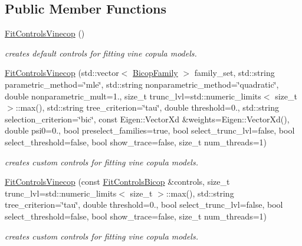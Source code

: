 \subsection*{Public Member Functions}
\begin{DoxyCompactItemize}
\item 
\mbox{\label{classvinecopulib_1_1_fit_controls_vinecop_ad101d135c8d8fe66046d931947f45bef}} 
\hyperlink{classvinecopulib_1_1_fit_controls_vinecop_ad101d135c8d8fe66046d931947f45bef}{Fit\+Controls\+Vinecop} ()
\begin{DoxyCompactList}\small\item\em creates default controls for fitting vine copula models. \end{DoxyCompactList}\item 
\hyperlink{classvinecopulib_1_1_fit_controls_vinecop_a94112587de376b493be4445aab15b7ce}{Fit\+Controls\+Vinecop} (std\+::vector$<$ \hyperlink{namespacevinecopulib_a42e95cc06d33896199caab0c11ad44f3}{Bicop\+Family} $>$ family\+\_\+set, std\+::string parametric\+\_\+method=\char`\"{}mle\char`\"{}, std\+::string nonparametric\+\_\+method=\char`\"{}quadratic\char`\"{}, double nonparametric\+\_\+mult=1., size\+\_\+t trunc\+\_\+lvl=std\+::numeric\+\_\+limits$<$ size\+\_\+t $>$\+::max(), std\+::string tree\+\_\+criterion=\char`\"{}tau\char`\"{}, double threshold=0., std\+::string selection\+\_\+criterion=\char`\"{}bic\char`\"{}, const Eigen\+::\+Vector\+Xd \&weights=Eigen\+::\+Vector\+Xd(), double psi0=0., bool preselect\+\_\+families=true, bool select\+\_\+trunc\+\_\+lvl=false, bool select\+\_\+threshold=false, bool show\+\_\+trace=false, size\+\_\+t num\+\_\+threads=1)
\begin{DoxyCompactList}\small\item\em creates custom controls for fitting vine copula models. \end{DoxyCompactList}\item 
\hyperlink{classvinecopulib_1_1_fit_controls_vinecop_a22cb78b491409cb9ce6e8a17dc21e7b8}{Fit\+Controls\+Vinecop} (const \hyperlink{classvinecopulib_1_1_fit_controls_bicop}{Fit\+Controls\+Bicop} \&controls, size\+\_\+t trunc\+\_\+lvl=std\+::numeric\+\_\+limits$<$ size\+\_\+t $>$\+::max(), std\+::string tree\+\_\+criterion=\char`\"{}tau\char`\"{}, double threshold=0., bool select\+\_\+trunc\+\_\+lvl=false, bool select\+\_\+threshold=false, bool show\+\_\+trace=false, size\+\_\+t num\+\_\+threads=1)
\begin{DoxyCompactList}\small\item\em creates custom controls for fitting vine copula models. \end{DoxyCompactList}\end{DoxyCompactItemize}
